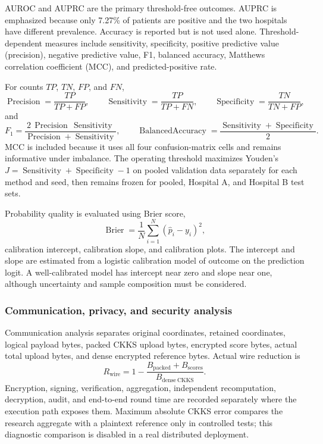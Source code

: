 AUROC and AUPRC are the primary threshold-free outcomes. AUPRC is emphasized because only 7.27\% of patients are positive and the two hospitals have different prevalence. Accuracy is reported but is not used alone. Threshold-dependent measures include sensitivity, specificity, positive predictive value (precision), negative predictive value, F1, balanced accuracy, Matthews correlation coefficient (MCC), and predicted-positive rate.

For counts $TP$, $TN$, $FP$, and $FN$,
\begin{equation}
    \operatorname{Precision}=\frac{TP}{TP+FP},\qquad
    \operatorname{Sensitivity}=\frac{TP}{TP+FN},\qquad
    \operatorname{Specificity}=\frac{TN}{TN+FP},
    \label{eq:classification-rates}
\end{equation}
and
\begin{equation}
    F_1=\frac{2\,\operatorname{Precision}\,\operatorname{Sensitivity}}
    {\operatorname{Precision}+\operatorname{Sensitivity}},
    \qquad
    \operatorname{BalancedAccuracy}=\frac{\operatorname{Sensitivity}+\operatorname{Specificity}}{2}.
    \label{eq:f1-balanced}
\end{equation}
MCC is included because it uses all four confusion-matrix cells and remains informative under imbalance. The operating threshold maximizes Youden's $J=\operatorname{Sensitivity}+\operatorname{Specificity}-1$ on pooled validation data separately for each method and seed, then remains frozen for pooled, Hospital A, and Hospital B test sets.

Probability quality is evaluated using Brier score,
\begin{equation}
    \operatorname{Brier}=\frac{1}{N}\sum_{i=1}^{N}(\hat p_i-y_i)^2,
    \label{eq:brier}
\end{equation}
calibration intercept, calibration slope, and calibration plots. The intercept and slope are estimated from a logistic calibration model of outcome on the prediction logit. A well-calibrated model has intercept near zero and slope near one, although uncertainty and sample composition must be considered.

\subsubsection{Communication, privacy, and security analysis}

Communication analysis separates original coordinates, retained coordinates, logical payload bytes, packed CKKS upload bytes, encrypted score bytes, actual total upload bytes, and dense encrypted reference bytes. Actual wire reduction is
\begin{equation}
    R_{\mathrm{wire}}=1-\frac{B_{\mathrm{packed}}+B_{\mathrm{scores}}}{B_{\mathrm{dense\ CKKS}}}.
    \label{eq:wire-reduction}
\end{equation}
Encryption, signing, verification, aggregation, independent recomputation, decryption, audit, and end-to-end round time are recorded separately where the execution path exposes them. Maximum absolute CKKS error compares the research aggregate with a plaintext reference only in controlled tests; this diagnostic comparison is disabled in a real distributed deployment.

